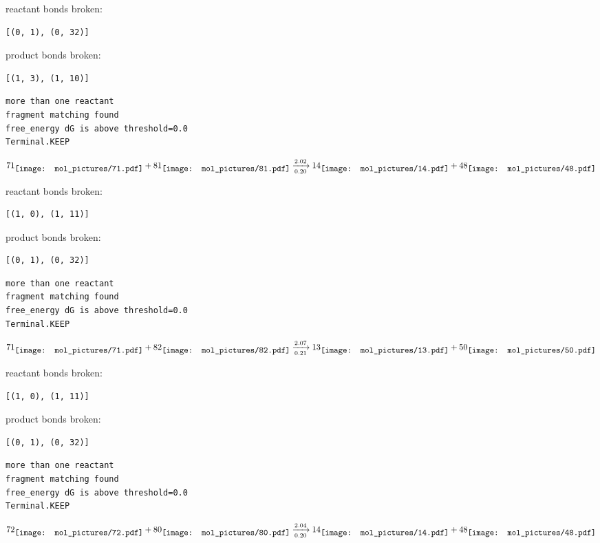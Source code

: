\documentclass{article}
\begin{document}
reactant bonds broken:\begin{verbatim}
[(0, 1), (0, 32)]
\end{verbatim}
product bonds broken:\begin{verbatim}
[(1, 3), (1, 10)]
\end{verbatim}




\vspace{1cm}
\begin{verbatim}
more than one reactant
fragment matching found
free_energy dG is above threshold=0.0
Terminal.KEEP
\end{verbatim}
$$
71
\raisebox{-.5\height}{\texttt{[image: mol\_pictures/71.pdf]}}
+
81
\raisebox{-.5\height}{\texttt{[image: mol\_pictures/81.pdf]}}
\xrightarrow[0.20]{2.02}
14
\raisebox{-.5\height}{\texttt{[image: mol\_pictures/14.pdf]}}
+
48
\raisebox{-.5\height}{\texttt{[image: mol\_pictures/48.pdf]}}
$$


reactant bonds broken:\begin{verbatim}
[(1, 0), (1, 11)]
\end{verbatim}
product bonds broken:\begin{verbatim}
[(0, 1), (0, 32)]
\end{verbatim}




\vspace{1cm}
\begin{verbatim}
more than one reactant
fragment matching found
free_energy dG is above threshold=0.0
Terminal.KEEP
\end{verbatim}
$$
71
\raisebox{-.5\height}{\texttt{[image: mol\_pictures/71.pdf]}}
+
82
\raisebox{-.5\height}{\texttt{[image: mol\_pictures/82.pdf]}}
\xrightarrow[0.21]{2.07}
13
\raisebox{-.5\height}{\texttt{[image: mol\_pictures/13.pdf]}}
+
50
\raisebox{-.5\height}{\texttt{[image: mol\_pictures/50.pdf]}}
$$


reactant bonds broken:\begin{verbatim}
[(1, 0), (1, 11)]
\end{verbatim}
product bonds broken:\begin{verbatim}
[(0, 1), (0, 32)]
\end{verbatim}




\vspace{1cm}
\begin{verbatim}
more than one reactant
fragment matching found
free_energy dG is above threshold=0.0
Terminal.KEEP
\end{verbatim}
$$
72
\raisebox{-.5\height}{\texttt{[image: mol\_pictures/72.pdf]}}
+
80
\raisebox{-.5\height}{\texttt{[image: mol\_pictures/80.pdf]}}
\xrightarrow[0.20]{2.04}
14
\raisebox{-.5\height}{\texttt{[image: mol\_pictures/14.pdf]}}
+
48
\raisebox{-.5\height}{\texttt{[image: mol\_pictures/48.pdf]}}
$$
\end{document}
